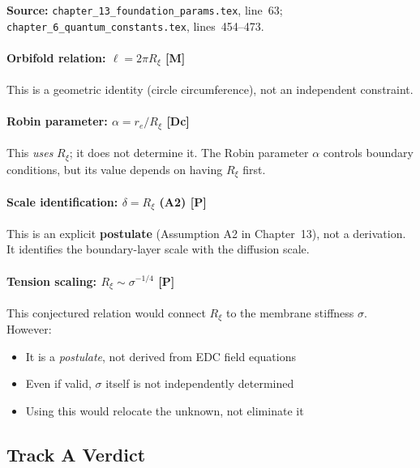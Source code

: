 \documentclass[11pt,a4paper]{article}
\newcommand{\Rxi}{R_\xi}
\newcommand{\re}{r_e}
\begin{document}
\textbf{Source:} \texttt{chapter\_13\_foundation\_params.tex}, line~63;
\texttt{chapter\_6\_quantum\_constants.tex}, lines~454--473.

\paragraph{Orbifold relation: $\ell = 2\pi\Rxi$ [M]}

This is a geometric identity (circle circumference), not an independent constraint.

\paragraph{Robin parameter: $\alpha = \re/\Rxi$ [Dc]}

This \emph{uses} $\Rxi$; it does not determine it. The Robin parameter $\alpha$
controls boundary conditions, but its value depends on having $\Rxi$ first.

\paragraph{Scale identification: $\delta = \Rxi$ (A2) [P]}

This is an explicit \textbf{postulate} (Assumption A2 in Chapter~13),
not a derivation. It identifies the boundary-layer scale with the diffusion scale.

\paragraph{Tension scaling: $\Rxi \sim \sigma^{-1/4}$ [P]}

This conjectured relation would connect $\Rxi$ to the membrane stiffness $\sigma$.
However:
\begin{itemize}
    \item It is a \emph{postulate}, not derived from EDC field equations
    \item Even if valid, $\sigma$ itself is not independently determined
    \item Using this would relocate the unknown, not eliminate it
\end{itemize}

\subsection{Track A Verdict}
\end{document}
